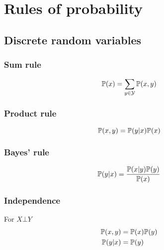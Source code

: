 \chapter{Rules of probability}\label{app_ProbRules}

\section{Discrete random variables}

\subsection{Sum rule}

\begin{equation} \label{eqn_SumRuleD}
\mathbb{P}(x) = \sum_{y\in\mathcal{Y}} \mathbb{P}(x,y)
\end{equation}

\subsection{Product rule}

\begin{equation} \label{eqn_ProductRuleD}
\mathbb{P}(x,y) = \mathbb{P}(y|x) \mathbb{P}(x)
\end{equation}

\subsection{Bayes' rule}

\begin{equation} \label{eqn_BayesRuleD}
\mathbb{P}(y|x) = \frac{\mathbb{P}(x|y)\mathbb{P}(y)}{\mathbb{P}(x)}
\end{equation}

\subsection{Independence}

For $X \bot Y$
\begin{align}
\mathbb{P}(x,y)   & = \mathbb{P}(x) \mathbb{P}(y) \label{eqn_Indep1D} \\
\mathbb{P}(y|x)   & = \mathbb{P}(y)          \label{eqn_Indep2D}
\end{align}

